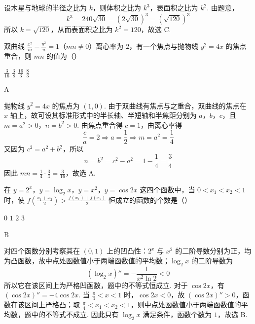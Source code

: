 \begin{solution}
设木星与地球的半径之比为 \(k\)，则体积之比为 \(k^3\)，表面积之比为 \(k^2\). 由题意，
\[
k^3=240\sqrt{30}=(2\sqrt{30})^3=(\sqrt{120})^3
\]
所以 \(k=\sqrt{120}\)，从而表面积之比为 \(k^2=120\)，故选 C.
\end{solution}

\begin{problem}
双曲线 \(\frac{x^2}{m} - \frac{y^2}{n} = 1\)（\(mn \neq 0\)）离心率为 \(2\)，有一个焦点与抛物线 \(y^2 = 4x\) 的焦点重合，则 \(mn\) 的值为（\quad）

\choices
    {\(\frac{3}{16}\)}
    {\( \frac{3}{8} \)}
    {\(\frac{16}{3}\)}
    {\(\frac{8}{3}\)}
\end{problem}

\begin{answer}
A
\end{answer}

\begin{solution}
抛物线 \(y^2=4x\) 的焦点为 \((1,0)\). 由于双曲线有焦点与之重合，双曲线的焦点在 \(x\) 轴上，故可设其标准形式中的半长轴、半短轴和半焦距分别为 \(a\)，\(b\)，\(c\)，且 \(m=a^2>0\)，\(n=b^2>0\). 由焦点重合得 \(c=1\)，由离心率得
\[
\frac{c}{a}=2\Longrightarrow a=\frac12\Longrightarrow m=a^2=\frac14
\]
又因为 \(c^2=a^2+b^2\)，所以
\[
n=b^2=c^2-a^2=1-\frac14=\frac34
\]
因此 \(mn=\frac14\cdot\frac34=\frac{3}{16}\)，故选 A.
\end{solution}

\begin{problem}
在 \( y = 2^{x} \)，\( y = \log_{2} x \)，\( y = x^{2} \)，\( y = \cos 2x \) 这四个函数中，当 \( 0 < x_{1} < x_{2} < 1 \) 时，使 \( f\left(\frac{x_{1} + x_{2}}{2}\right) > \frac{f(x_{1}) + f(x_{2})}{2} \) 恒成立的函数的个数是（\quad）

\choices
    {\(0\)}
    {\(1\)}
    {\(2\)}
    {\(3\)}
\end{problem}

\begin{answer}
B
\end{answer}

\begin{solution}
对四个函数分别考察其在 \((0,1)\) 上的凹凸性：\(2^x\) 与 \(x^2\) 的二阶导数分别为正，均为凸函数，故中点处函数值小于两端函数值的平均数；\(\log_2x\) 的二阶导数为
\[
\left(\log_2x\right)''=-\frac{1}{x^2\ln2}<0
\]
所以它在该区间上为严格凹函数，题中的不等式恒成立. 对于 \(\cos2x\)，有 \(\left(\cos2x\right)''=-4\cos2x\). 当 \(\frac\pi4<x<1\) 时，\(\cos2x<0\)，故 \(\left(\cos2x\right)''>0\)，函数在该区间上严格凸；取 \(\frac\pi4<x_1<x_2<1\)，则中点处函数值小于两端函数值的平均数，题中的不等式不成立. 因此只有 \(\log_2x\) 满足条件，函数个数为 \(1\)，故选 B.
\end{solution}

